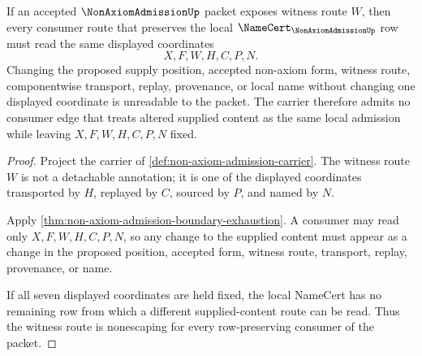 \begin{theorem}
\label{thm:non-axiom-admission-witness-route-nonescape}
If an accepted $\NonAxiomAdmissionUp$ packet exposes witness route $W$, then every consumer route that preserves the local $\NameCert_{\NonAxiomAdmissionUp}$ row must read the same displayed coordinates
$$
X,F,W,H,C,P,N .
$$
Changing the proposed supply position, accepted non-axiom form, witness route, componentwise transport, replay, provenance, or local name without changing one displayed coordinate is unreadable to the packet. The carrier therefore admits no consumer edge that treats altered supplied content as the same local admission while leaving $X,F,W,H,C,P,N$ fixed.
\end{theorem}
\begin{proof}
Project the carrier of \autoref{def:non-axiom-admission-carrier}. The witness route $W$ is not a detachable annotation; it is one of the displayed coordinates transported by $H$, replayed by $C$, sourced by $P$, and named by $N$.

Apply \autoref{thm:non-axiom-admission-boundary-exhaustion}. A consumer may read only $X,F,W,H,C,P,N$, so any change to the supplied content must appear as a change in the proposed position, accepted form, witness route, transport, replay, provenance, or name.

If all seven displayed coordinates are held fixed, the local NameCert has no remaining row from which a different supplied-content route can be read. Thus the witness route is nonescaping for every row-preserving consumer of the packet.
\end{proof}

